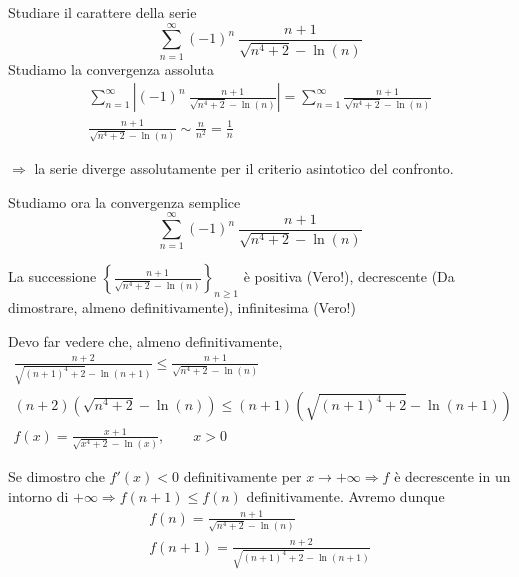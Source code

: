 \begin{exbar}
\begin{example}
	
	Studiare il carattere della serie 
	\begin{equation*}
		\sum_{n=1}^{\infty} (-1)^n \ \frac{n+1}{\sqrt{n^4 + 2} - \ln(n)}
	\end{equation*}
	Studiamo la convergenza assoluta
	\begin{gather*}
		\sum_{n=1}^{\infty} \left| (-1)^n \ \frac{n+1}{\sqrt{n^4 + 2} - \ln(n)} \right| = \sum_{n=1}^{\infty} \frac{n+1}{\sqrt{n^4 + 2} - \ln(n)}
		\\
		\frac{n+1}{\sqrt{n^4 + 2} - \ln(n)} \sim  \frac{n}{n^2} = \frac{1}{n}
	\end{gather*}
	
	$\Rightarrow$ la serie diverge assolutamente per il criterio asintotico del confronto.
	
	Studiamo ora la convergenza semplice
	\begin{equation*}
		\sum_{n=1}^{\infty} (-1)^n \ \frac{n+1}{\sqrt{n^4 + 2} - \ln(n)}
	\end{equation*}
	
	La successione $\left\{ \frac{n+1} {\sqrt{n^4 + 2} - \ln(n)} \right\} _ {n \geq 1}$ è positiva (Vero!), decrescente (Da dimostrare, almeno definitivamente), infinitesima (Vero!)
	
	Devo far vedere che, almeno definitivamente, 
	\begin{gather*}
		\frac{n + 2} {\sqrt{ (n + 1)^4 + 2} - \ln(n + 1)} \leq \frac{n + 1} {\sqrt{n^4 + 2} - \ln(n)}
		\\
		(n + 2) \left( \sqrt{n^4 + 2} -\ln(n) \right) \leq (n + 1) \left( \sqrt{(n + 1)^4 + 2} - \ln(n+1) \right)
 		\\
		f(x) = \frac{x + 1} {\sqrt{x^4 + 2} - \ln(x)} , \qquad x > 0
	\end{gather*}
	
	Se dimostro che $f'(x)<0$ definitivamente per $x \rightarrow +\infty \Rightarrow f$ è decrescente in un intorno di $+\infty \Rightarrow f(n+1) \leq f(n)$ definitivamente. Avremo dunque
	\begin{gather*}
		f(n) = \frac{n + 1} {\sqrt{n^4 + 2} - \ln(n)}
		\\
		f(n+1) = \frac{n + 2} {\sqrt{(n + 1)^4 + 2} - \ln(n+1)}
	\end{gather*}
	

\end{example}
\end{exbar}
